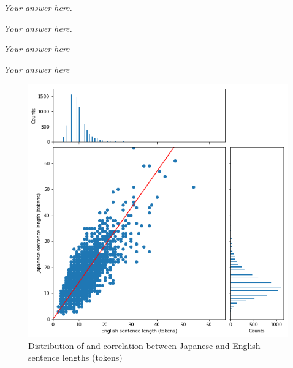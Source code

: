 \documentclass[answers]{exam}
\begin{document}
\begin{CJK}{UTF8}{min}
\begin{questions}
\begin{framed}
\emph{Your answer here.}
\end{framed}


\begin{framed}
\emph{Your answer here.}
\end{framed}



\begin{framed}
\emph{Your answer here}
\end{framed}

\begin{framed}
\emph{Your answer here}
\end{framed}
\end{questions}

\noindent \hrulefill

\clearpage




\begin{figure}
  \centering
  \includegraphics[width=\linewidth]{fig-corr-toks}
  \caption[Sentence lenths (tokens)]%
  {Distribution of and correlation between Japanese and English sentence lengths (tokens)}
  \label{fig:corr-toks}
\end{figure}


\end{CJK}
\end{document}
